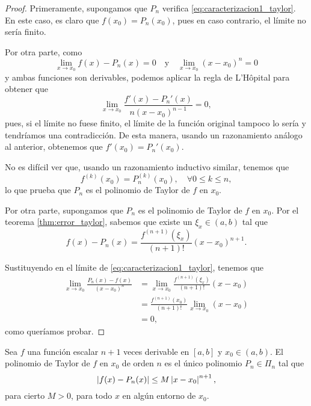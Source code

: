     \begin{proof}
      Primeramente, supongamos que $P_n$ verifica
      \ref{eq:caracterizacion1_taylor}. En este caso, es claro que
      $f(x_0) = P_n(x_0)$, pues en caso contrario, el límite no sería
      finito.

      Por otra parte, como
      \[
        \lim_{x \to x_0} f(x) - P_n(x) = 0
        \quad \text{y} \quad
        \lim_{x \to x_0} (x - x_0)^n = 0
      \]
      y ambas funciones son derivables, podemos aplicar la regla de
      L'Hôpital para obtener que
      \[
        \lim_{x \to x_0} \frac{f'(x) - P_n'(x)}{n (x - x_0)^{n-1}} = 0,
      \]
      pues, si el límite no fuese finito, el límite de la función original
      tampoco lo sería y tendríamos una contradicción. De esta manera,
      usando un razonamiento análogo al anterior, obtenemos que $f'(x_0) =
      P_n'(x_0)$.

      No es difícil ver que, usando un razonamiento inductivo similar,
      tenemos que
      \[
        f^{(k)}(x_0) = P_n^{(k)}(x_0), \quad \forall 0 \le k \le n,
      \]
      lo que prueba que $P_n$ es el polinomio de Taylor de $f$ en $x_0$.

      Por otra parte, supongamos que $P_n$ es el polinomio de Taylor de $f$
      en $x_0$. Por el teorema \ref{thm:error_taylor}, sabemos que existe
      un $\xi_x \in (a, b)$ tal que
      \[
        f(x) - P_n(x) = \frac{f^{(n+1)}(\xi_x)}{(n+1)!}(x - x_0)^{n+1}.
      \]

      Sustituyendo en el límite de \ref{eq:caracterizacion1_taylor},
      tenemos que
      \[
        \begin{split}
          \lim_{x \to x_0} \frac{P_n(x) - f(x)}{(x - x_0)^n}
          &= \lim_{x \to x_0} \frac{f^{(n+1)}(\xi_x)}{(n+1)!}(x - x_0) \\
          &= \frac{f^{(n+1)}(x_0)}{(n+1)!} \lim_{x \to x_0} (x - x_0) \\
          &= 0,
        \end{split}
      \]
      como queríamos probar.
    \end{proof}

    \begin{proposition}
      Sea $f$ una función escalar $n + 1$ veces derivable en $[a, b]$ y
      $x_0 \in (a, b)$. El polinomio de Taylor de $f$ en $x_0$ de orden $n$
      es el único polinomio $P_n \in \Pi_n$ tal que
      \begin{equation} \label{eq:caracterizacion2_taylor}
        \left|f(x) - P_n(x)\right| \le M \left|x - x_0\right|^{n+1},
      \end{equation}
      para cierto $M > 0$, para todo $x$ en algún entorno de $x_0$.
    \end{proposition}


